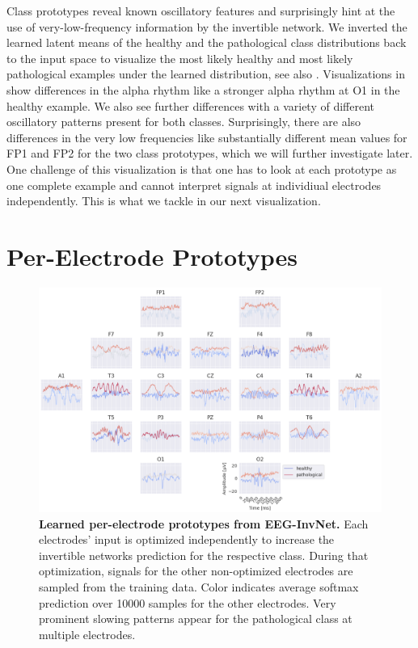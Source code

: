     Class prototypes reveal known oscillatory features and surprisingly hint
at the use of very-low-frequency information by the invertible network.
We inverted the learned latent means of the healthy and the pathological
class distributions back to the input space to visualize the most likely
healthy and most likely pathological examples under the learned
distribution, see also .
Visualizations in  show
differences in the alpha rhythm like a stronger alpha rhythm at O1 in
the healthy example. We also see further differences with a variety of
different oscillatory patterns present for both classes. Surprisingly,
there are also differences in the very low frequencies like
substantially different mean values for FP1 and FP2 for the two class
prototypes, which we will further investigate later. One challenge of
this visualization is that one has to look at each prototype as one
complete example and cannot interpret signals at individiual electrodes
independently. This is what we tackle in our next visualization.

\section{Per-Electrode Prototypes}\label{per-channel-prototypes}

\begin{figure}[htb]
    \myfloatalign
    \includegraphics[width=1\linewidth]{images/marginal-chan-6.png}
    \caption[Learned per-electrode prototypes from EEG-InvNet]{
\textbf{Learned per-electrode prototypes from EEG-InvNet.} Each electrodes'
input is optimized independently to increase the invertible networks
prediction for the respective class. During that optimization, signals
for the other non-optimized electrodes are sampled from the training data.
Color indicates average softmax prediction over 10000 samples for the
other electrodes. Very prominent slowing patterns appear for the
pathological class at multiple electrodes.
}
\label{marginal-chan}
\end{figure}


